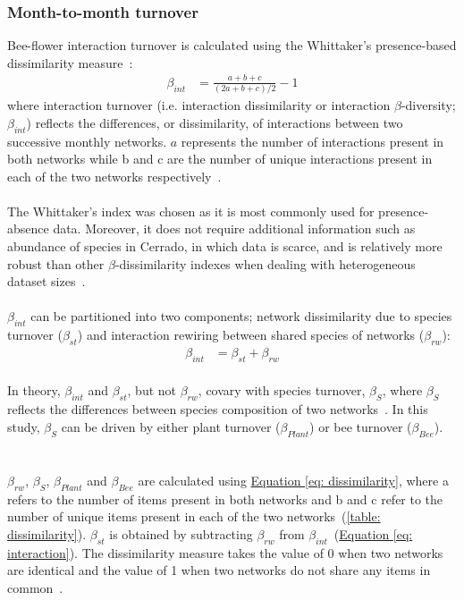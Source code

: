 \documentclass[11pt]{article}
\begin{document}
\subsubsection{Month-to-month turnover}
Bee-flower interaction turnover is calculated using the Whittaker's presence-based dissimilarity measure~\citep{Whittaker1960}: 
\begin{align}
	\beta_{int} & = \frac{a + b + c}{(2a + b + c)/2} - 1 
\label{eq: dissimilarity}
\end{align}
where interaction turnover (i.e. interaction dissimilarity or interaction $\beta$-diversity; $\beta_{int}$) reflects the differences, or dissimilarity, of interactions between two successive monthly networks. $a$ represents the number of interactions present in both networks while b and c are the number of unique interactions present in each of the two networks respectively~\citep{Poisot2012}. \\
\\
The Whittaker's index was chosen as it is most commonly used for presence-absence data. Moreover, it does not require additional information such as abundance of species in Cerrado, in which data is scarce, and is relatively more robust than other $\beta$-dissimilarity indexes when dealing with heterogeneous dataset sizes~\citep{Koleff2003, Poisot2012}. \\
\\
$\beta_{int}$ can be partitioned into two components; network dissimilarity due to species turnover ($\beta_{st}$) and interaction rewiring between shared species of networks ($\beta_{rw}$):
\begin{align}
	\beta_{int} & = \beta_{st} + \beta_{rw} 
\label{eq: interaction}
\end{align}
\vspace{0.1cm} \\
In theory, $\beta_{int}$ and $\beta_{st}$, but not $\beta_{rw}$, covary with species turnover, $\beta_{S}$, where $\beta_{S}$ reflects the differences between species composition of two networks~\citep{Poisot2012}. In this study, $\beta_{S}$ can be driven by either plant turnover ($\beta_{Plant}$) or bee turnover ($\beta_{Bee}$). \\
\\
\\
$\beta_{rw}$, $\beta_{S}$, $\beta_{Plant}$ and $\beta_{Bee}$ are calculated using \hyperref[eq: dissimilarity]{Equation \ref{eq: dissimilarity}}, where a refers to the number of items present in both networks and b and c refer to the number of unique items present in each of the two networks~(\autoref{table: dissimilarity}). $\beta_{st}$ is obtained by subtracting $\beta_{rw}$ from $\beta_{int}$~(\hyperref[eq: interaction]{Equation \ref{eq: interaction}}). The dissimilarity measure takes the value of 0 when two networks are identical and the value of 1 when two networks do not share any items in common~\citep{Poisot2012, CaraDonna2017}. \\
\end{document}
